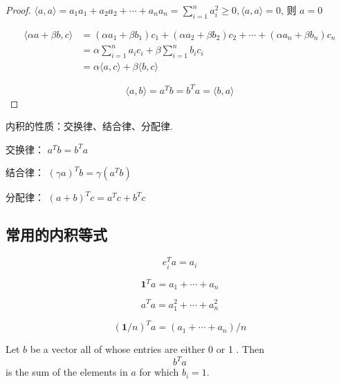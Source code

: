 \begin{proof}
    \( \langle a, a\rangle=a_{1} a_{1}+a_{2} a_{2}+\cdots+a_{n} a_{n}=\sum_{i=1}^{n} a_{i}^{2} \geq 0,\langle a, a\rangle=0 \), 则 \( a=0 \)

    $$\begin{aligned} \langle\alpha a+\beta {b}, {c}\rangle &=\left(\alpha a_{1}+\beta b_{1}\right) c_{1}+\left(\alpha a_{2}+\beta b_{2}\right) c_{2}+\cdots+\left(\alpha a_{n}+\beta b_{n}\right) c_{n} 
    \\ &=\alpha \sum_{i=1}^{n} a_{i} c_{i}+\beta \sum_{i=1}^{n} b_{i} c_{i}
    \\ &=\alpha\langle a, c\rangle+\beta\langle b, c\rangle\end{aligned} $$

    $$ \langle a, b\rangle=a^{{T}} b=b^{{T}} a=\langle b, a\rangle $$
\end{proof}

内积的性质：交换律、结合律、分配律. 

交换律： \( a^{T} b=b^{T} a \)

结合律： \( (\gamma a)^{T} b=\gamma\left(a^{T} b\right) \)

分配律： \( (a+b)^{T} c=a^{T} c+b^{T} c \)

\subsection{常用的内积等式}
\begin{corollary}[选出第$i$项]
    $$ e_{i}^{T} a=a_{i} $$
\end{corollary}

\begin{corollary}[向量每一项之和]
    $$ \mathbf{1}^{T} a=a_{1}+\cdots+a_{n} $$
\end{corollary}

\begin{corollary}[向量每一项的平方和]
    $$ a^{T} a=a_{1}^{2}+\cdots+a_{n}^{2} $$
\end{corollary}

\begin{corollary}[向量元素的平均值]
    $$ (\mathbf{1} / n)^{T} a=\left(a_{1}+\cdots+a_{n}\right) / n $$
\end{corollary}

\begin{corollary}
    Let $ b $ be a vector all of whose entries are either 0 or 1 . Then $$ b^{T} a $$ is the sum of the elements in $ a $ for which $ b_{i}=1 $.
\end{corollary}

